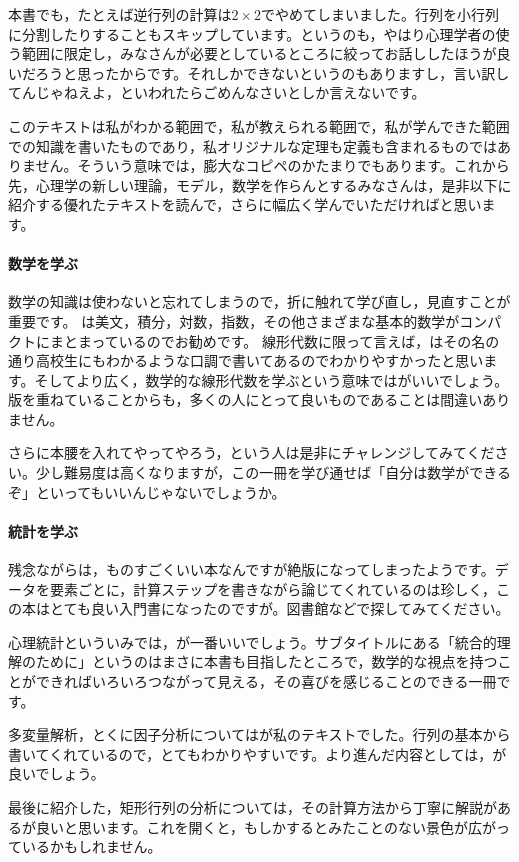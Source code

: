 \documentclass{ltjsbook}
\begin{document}
本書でも，たとえば逆行列の計算は$2 \times 2$でやめてしまいました。行列を小行列に分割したりすることもスキップしています。というのも，やはり心理学者の使う範囲に限定し，みなさんが必要としているところに絞ってお話ししたほうが良いだろうと思ったからです。それしかできないというのもありますし，言い訳してんじゃねえよ，といわれたらごめんなさいとしか言えないです。

このテキストは私がわかる範囲で，私が教えられる範囲で，私が学んできた範囲での知識を書いたものであり，私オリジナルな定理も定義も含まれるものではありません。そういう意味では，膨大なコピペのかたまりでもあります。これから先，心理学の新しい理論，モデル，数学を作らんとするみなさんは，是非以下に紹介する優れたテキストを読んで，さらに幅広く学んでいただければと思います。

\paragraph{数学を学ぶ}
数学の知識は使わないと忘れてしまうので，折に触れて学び直し，見直すことが重要です。
\textcite{Nakano2017}は美文，積分，対数，指数，その他さまざまな基本的数学がコンパクトにまとまっているのでお勧めです。
線形代数に限って言えば，\textcite{Takeuchi2010}はその名の通り高校生にもわかるような口調で書いてあるのでわかりやすかったと思います。そしてより広く，数学的な線形代数を学ぶという意味では\textcite{Murakami20160301}がいいでしょう。版を重ねていることからも，多くの人にとって良いものであることは間違いありません。

さらに本腰を入れてやってやろう，という人は是非\textcite{Nagata20050401}にチャレンジしてみてください。少し難易度は高くなりますが，この一冊を学び通せば「自分は数学ができるぞ」といってもいいんじゃないでしょうか。

\paragraph{統計を学ぶ}
残念ながら\textcite{Okada200804}は，ものすごくいい本なんですが絶版になってしまったようです。データを要素ごとに，計算ステップを書きながら論じてくれているのは珍しく，この本はとても良い入門書になったのですが。図書館などで探してみてください。

心理統計といういみでは，\textcite{Haebara200206}が一番いいでしょう。サブタイトルにある「統合的理解のために」というのはまさに本書も目指したところで，数学的な視点を持つことができればいろいろつながって見える，その喜びを感じることのできる一冊です。

多変量解析，とくに因子分析については\textcite{Shibasuke197901}が私のテキストでした。行列の基本から書いてくれているので，とてもわかりやすいです。より進んだ内容としては，\textcite{Yanai1990}が良いでしょう。

最後に紹介した，矩形行列の分析については，その計算方法から丁寧に解説がある\textcite{Nishisato2010}が良いと思います。これを開くと，もしかするとみたことのない景色が広がっているかもしれません。
\end{document}
